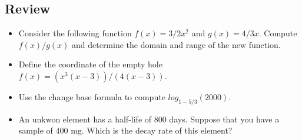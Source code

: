 \documentclass[../main-exe.tex]{subfiles}
\begin{document}
\subsection{Review}

\begin{itemize}
    \item Consider the following function $f(x)=3/2 x^2$ and $g(x)=4/3x$. Compute $f(x)/g(x)$ and determine the domain and range of the new function.
    \item Define the coordinate of the empty hole $f(x)=(x^3(x-3))/(4(x-3))$.
    \item Use the change base formula to compute $log_{1-5/3}(2000)$.
    \item An unkwon element has a half-life of 800 days. Suppose that you have a sample of $400$ mg. Which is the decay rate of this element?
\end{itemize}
\end{document}
